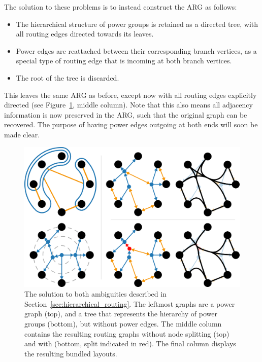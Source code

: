 The solution to these problems is to instead construct the ARG as follows:
\begin{mdframed}[backgroundcolor=WhiteSmoke]
\begin{itemize}[leftmargin=*]
  \item The hierarchical structure of power groups is retained as a directed tree, with all routing edges directed towards its leaves.
  \item Power edges are reattached between their corresponding branch vertices, as a special type of routing edge that is incoming at both branch vertices.
  \item The root of the tree is discarded.
\end{itemize}
\end{mdframed}
This leaves the same ARG as before, except now with all routing edges explicitly directed (see Figure~\ref{fig:radial}, middle column).
Note that this also means all adjacency information is now preserved in the ARG, such that the original graph can be recovered.
The purpose of having power edges outgoing at both ends will soon be made clear.


\begin{figure}
  \centering
  \includegraphics[width=.8\linewidth]{power/solution.pdf}
  \caption[A fixed method for confluent drawing]{The solution to both ambiguities described in Section~\ref{sec:hierarchical_routing}.
  The leftmost graphs are a power graph (top), and a tree that represents the hierarchy of power groups (bottom), but without power edges.
  The middle column contains the resulting routing graphs without node splitting (top) and with (bottom, split indicated in red).
  The final column displays the resulting bundled layouts.
  }
  \label{fig:radial}
\end{figure}

